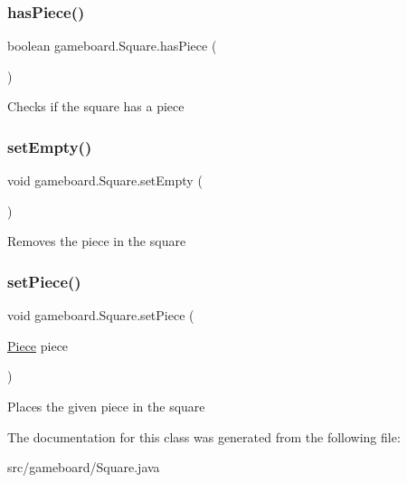 \subsubsection{\texorpdfstring{has\+Piece()}{hasPiece()}}
{\footnotesize\ttfamily boolean gameboard.\+Square.\+has\+Piece (\begin{DoxyParamCaption}{ }\end{DoxyParamCaption})}

Checks if the square has a piece \mbox{\label{classgameboard_1_1_square_abc200e09f6066535d09eab796688eabe}} 
\subsubsection{\texorpdfstring{set\+Empty()}{setEmpty()}}
{\footnotesize\ttfamily void gameboard.\+Square.\+set\+Empty (\begin{DoxyParamCaption}{ }\end{DoxyParamCaption})}

Removes the piece in the square \mbox{\label{classgameboard_1_1_square_ae3145cd4d46cf412624aef20c03b002b}} 
\subsubsection{\texorpdfstring{set\+Piece()}{setPiece()}}
{\footnotesize\ttfamily void gameboard.\+Square.\+set\+Piece (\begin{DoxyParamCaption}\item[{\mbox{\hyperlink{classpieces_1_1_piece}{Piece}}}]{piece }\end{DoxyParamCaption})}

Places the given piece in the square 

The documentation for this class was generated from the following file\+:\begin{DoxyCompactItemize}
\item 
src/gameboard/Square.\+java\end{DoxyCompactItemize}
